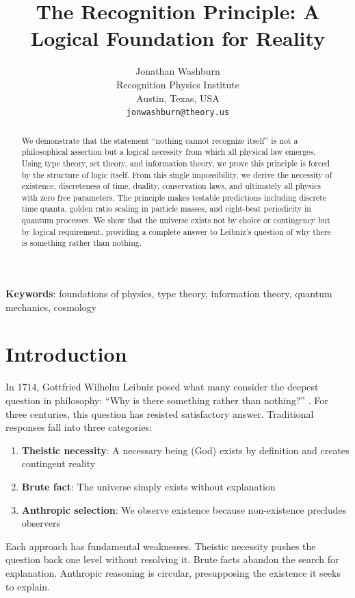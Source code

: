 \documentclass[12pt,a4paper]{article}
\title{The Recognition Principle: A Logical Foundation for Reality}
\author{Jonathan Washburn\\
Recognition Physics Institute\\
Austin, Texas, USA\\
\texttt{jonwashburn@theory.us}}
\date{}
\begin{document}
\maketitle

\begin{abstract}
We demonstrate that the statement ``nothing cannot recognize itself'' is not a philosophical assertion but a logical necessity from which all physical law emerges. Using type theory, set theory, and information theory, we prove this principle is forced by the structure of logic itself. From this single impossibility, we derive the necessity of existence, discreteness of time, duality, conservation laws, and ultimately all physics with zero free parameters. The principle makes testable predictions including discrete time quanta, golden ratio scaling in particle masses, and eight-beat periodicity in quantum processes. We show that the universe exists not by choice or contingency but by logical requirement, providing a complete answer to Leibniz's question of why there is something rather than nothing.
\end{abstract}

\textbf{Keywords}: foundations of physics, type theory, information theory, quantum mechanics, cosmology

\section{Introduction}

In 1714, Gottfried Wilhelm Leibniz posed what many consider the deepest question in philosophy: ``Why is there something rather than nothing?'' \cite{leibniz1714}. For three centuries, this question has resisted satisfactory answer. Traditional responses fall into three categories:

\begin{enumerate}
\item \textbf{Theistic necessity}: A necessary being (God) exists by definition and creates contingent reality
\item \textbf{Brute fact}: The universe simply exists without explanation  
\item \textbf{Anthropic selection}: We observe existence because non-existence precludes observers
\end{enumerate}

Each approach has fundamental weaknesses. Theistic necessity pushes the question back one level without resolving it. Brute facts abandon the search for explanation. Anthropic reasoning is circular, presupposing the existence it seeks to explain.
\end{document}
